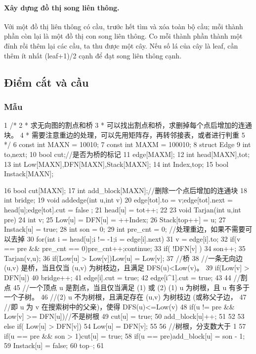 \documentclass[11pt]{article}
\begin{document}
\paragraph{Xây dựng đồ thị song liên thông.} Với một đồ thị liên thông có cầu, trước hết tìm và xóa toàn bộ cầu; mỗi thành phần còn lại là một đồ thị con song liên thông. Co mỗi thành phần thành một đỉnh rồi thêm lại các cầu, ta thu được một cây. Nếu số lá của cây là leaf, cần thêm ít nhất (leaf+1)/2 cạnh để đạt song liên thông cạnh.

\subsection{Điểm cắt và cầu}

\subsubsection{Mẫu}

\begin{Code}
 1   /*
 2   * 求无向图的割点和桥
 3   * 可以找出割点和桥，求删掉每个点后增加的连通块。
 4   * 需要注意重边的处理，可以先用矩阵存，再转邻接表，或者进行判重
 5   */
 6   const int MAXN = 10010;
 7   const int MAXM = 100010;
 8   struct Edge{
 9       int to,next;
10       bool cut;//是否为桥的标记
11   }edge[MAXM];
12   int head[MAXN],tot;
13   int Low[MAXN],DFN[MAXN],Stack[MAXN];
14   int Index,top;
15   bool Instack[MAXN];


16   bool cut[MAXN];
17   int add_block[MAXN];//删除一个点后增加的连通块
18   int bridge;
19   void addedge(int u,int v){
20       edge[tot].to = v;edge[tot].next = head[u];edge[tot].cut = false
            ;
21       head[u] = tot++;
22   }
23   void Tarjan(int u,int pre){
24       int v;
25       Low[u] = DFN[u] = ++Index;
26       Stack[top++] = u;
27       Instack[u] = true;
28       int son = 0;
29       int pre_cnt = 0; //处理重边，如果不需要可以去掉
30       for(int i = head[u];i != -1;i = edge[i].next){
31            v = edge[i].to;
32            if(v == pre && pre_cnt == 0){pre_cnt++;continue;}
33            if( !DFN[v] ){
34                son++;
35                Tarjan(v,u);
36                if(Low[u] > Low[v])Low[u] = Low[v];
37                //桥
38                //一条无向边 (u,v) 是桥，当且仅当 (u,v) 为树枝边，且满足
                     DFS(u)<Low(v)。
39                if(Low[v] > DFN[u]){
40                    bridge++;
41                    edge[i].cut = true;
42                    edge[i^1].cut = true;
43                }
44                //割点
45                //一个顶点 u 是割点，当且仅当满足 (1) 或 (2) (1) u 为树根，且
                     u 有多于一个子树。
46                //(2) u 不为树根，且满足存在 (u,v) 为树枝边 (或称父子边，
47                //即 u 为 v 在搜索树中的父亲)，使得 DFS(u)<=Low(v)
48                if(u != pre && Low[v] >= DFN[u]){//不是树根
49                    cut[u] = true;
50                    add_block[u]++;
51                }
52            }
53            else if( Low[u] > DFN[v])
54                 Low[u] = DFN[v];
55       }
56       //树根，分支数大于 1
57       if(u == pre && son > 1)cut[u] = true;
58       if(u == pre)add_block[u] = son - 1;
59       Instack[u] = false;
60       top--;
61   }
\end{Code}
\end{document}
